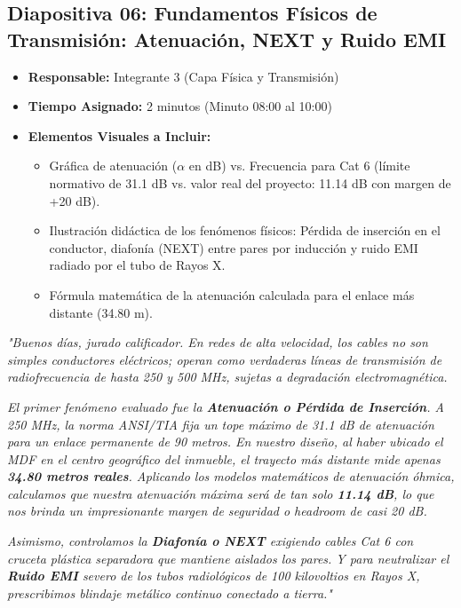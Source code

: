 \documentclass[11pt,a4paper]{article}
\begin{document}
\vspace{0.5cm}

\subsection{Diapositiva 06: Fundamentos Físicos de Transmisión: Atenuación, NEXT y Ruido EMI}
\begin{itemize}[leftmargin=*]
    \item \textbf{Responsable:} Integrante 3 (Capa Física y Transmisión)
    \item \textbf{Tiempo Asignado:} 2 minutos (Minuto 08:00 al 10:00)
    \item \textbf{Elementos Visuales a Incluir:}
    \begin{itemize}
        \item Gráfica de atenuación ($\alpha$ en dB) vs. Frecuencia para Cat 6 (límite normativo de 31.1 dB vs. valor real del proyecto: 11.14 dB con margen de +20 dB).
        \item Ilustración didáctica de los fenómenos físicos: Pérdida de inserción en el conductor, diafonía (NEXT) entre pares por inducción y ruido EMI radiado por el tubo de Rayos X.
        \item Fórmula matemática de la atenuación calculada para el enlace más distante (34.80 m).
    \end{itemize}
\end{itemize}

\begin{tcolorbox}[colback=white,colframe=primaryblue,title=\textbf{Speech Verbal del Integrante 3 (Guion Palabra por Palabra)}]
\textit{"Buenos días, jurado calificador. En redes de alta velocidad, los cables no son simples conductores eléctricos; operan como verdaderas líneas de transmisión de radiofrecuencia de hasta 250 y 500 MHz, sujetas a degradación electromagnética.}\par\vspace{2mm}
\textit{El primer fenómeno evaluado fue la \textbf{Atenuación o Pérdida de Inserción}. A 250 MHz, la norma ANSI/TIA fija un tope máximo de 31.1 dB de atenuación para un enlace permanente de 90 metros. En nuestro diseño, al haber ubicado el MDF en el centro geográfico del inmueble, el trayecto más distante mide apenas \textbf{34.80 metros reales}. Aplicando los modelos matemáticos de atenuación óhmica, calculamos que nuestra atenuación máxima será de tan solo \textbf{11.14 dB}, lo que nos brinda un impresionante margen de seguridad o headroom de casi 20 dB.}\par\vspace{2mm}
\textit{Asimismo, controlamos la \textbf{Diafonía o NEXT} exigiendo cables Cat 6 con cruceta plástica separadora que mantiene aislados los pares. Y para neutralizar el \textbf{Ruido EMI} severo de los tubos radiológicos de 100 kilovoltios en Rayos X, prescribimos blindaje metálico continuo conectado a tierra."}
\end{tcolorbox}
\end{document}
